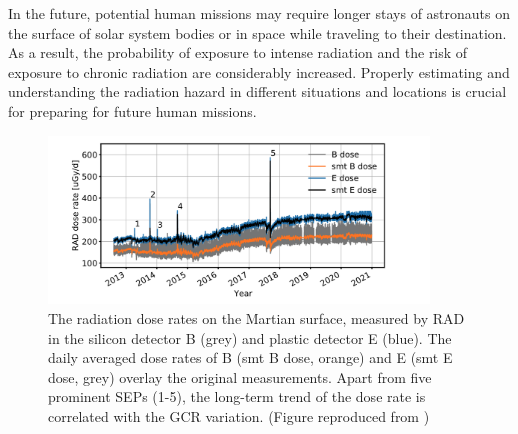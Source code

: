 In the future, potential human missions may require longer stays of astronauts on the surface of solar system bodies or in space while traveling to their destination. As a result, the probability of exposure to intense radiation and the risk of exposure to chronic radiation are considerably increased. Properly estimating and understanding the radiation hazard in different situations and locations is crucial for preparing for future human missions.







\begin{figure}[!hbt]
    \centering
    \includegraphics[width = 0.9\textwidth]{images/Rad_GCR_radiation.png}
    \caption[The long-term radiation dose rates on the Martian surface]{The radiation dose rates on the Martian surface, measured by \ac{RAD} in the silicon detector B (grey) and plastic detector E (blue). The daily averaged dose rates of B (smt B dose, orange) and E (smt E dose, grey) overlay the original measurements. Apart from five prominent \acp{SEP} (1-5), the long-term trend of the dose rate is correlated with the \ac{GCR} variation. (Figure reproduced from \citet{Guo2021AARv_rad})}
    \label{Fig:Rad_GCR_radiation}
\end{figure}


